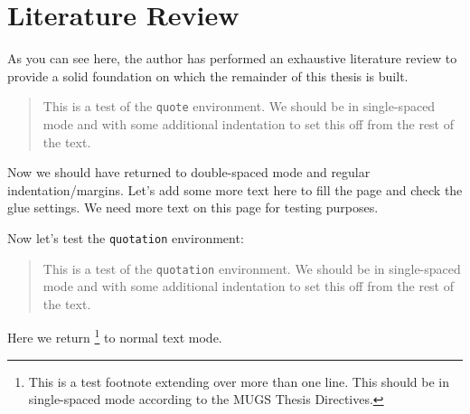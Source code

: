 \chapter{Literature Review} \label{cha:litreview}
As you can see here, the author has performed an exhaustive literature review to provide
a solid foundation on which the remainder of this thesis is built.
\begin{quote}
This is a test of the \verb+quote+ environment. We should be in single-spaced mode and with some additional indentation to set this off from the rest of the text.
\end{quote}
Now we should have returned to double-spaced mode and regular indentation/margins.
Let's add some more text here to fill the page and check the glue settings.
We need more text on this page for testing purposes.

Now let's test the \verb+quotation+ environment:
\begin{quotation}
This is a test of the \verb+quotation+ environment. We should be in single-spaced mode and with some additional indentation to set this off from the rest of the text.
\end{quotation}
Here we return%
\footnote{
  This is a test footnote extending over more than one line. 
  This should be in single-spaced mode according to the MUGS Thesis Directives.
} 
to normal text mode.

\lipsum